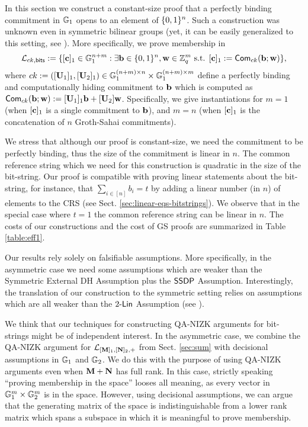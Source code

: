 In this section we construct a constant-size proof that a perfectly binding commitment in $\mathbb{G}_1$ opens to an element of $\{0,1\}^n$.   
Such a construction was unknown even in symmetric bilinear groups (yet, it can be easily generalized to this setting, see  \cite[Appendix C]{EPRINT:GonHevRaf15}).
More specifically, we prove membership in 
$$\mathcal{\mathcal{L}}_{ck,\mathsf{bits}} := 
    \{[\mathbf{c}]_1 \in \mathbb{G}_1^{n+m}: \exists \mathbf{b}\in\{0,1\}^n,\mathbf{w}\in\mathbb{Z}_q^m \text{ s.t. }
        [\mathbf{c}]_1:=  \mathsf{Com}_{ck}(\mathbf{b};\mathbf{w})
    \},$$
 where $ck:=([\mathbf{{U}}_1]_1,[\mathbf{{U}}_2]_1)\in\mathbb{G}_1^{(n+m)\times n}\times\mathbb{G}_1^{(n+m)\times m}$ define a perfectly binding and computationally hiding commitment to $\mathbf{b}$ which is computed as $\mathsf{Com}_{ck}(\mathbf{b};\allowbreak\mathbf{w}):=[\mathbf{{U}}_1]_1\mathbf{b}+[\mathbf{{U}}_2]\mathbf{w}$. Specifically, we give instantiations for $m=1$ (when $[\mathbf{c}]_1$ is a single commitment to $\mathbf{b}$), and $m=n$ (when $[\mathbf{c}]_1$ is the concatenation  of $n$ Groth-Sahai commitments).

We stress that although our proof is constant-size, we need the commitment to be perfectly binding, thus the size of the commitment is linear in $n$.  The common reference string  which we need for this construction is quadratic in the size of the bit-string. Our proof is compatible with proving linear statements about the bit-string, for instance,  
that $\sum_{i \in [n]} b_i=t$ by adding a linear number (in $n$) of elements to the CRS (see Sect. \ref{sec:linear-eqs-bitstrings}). We observe that in the special case where $t=1$ the common reference string can be linear in $n$. The costs of our constructions and the cost of GS proofs are summarized in Table \ref{table:eff1}.

Our results rely solely on falsifiable assumptions. More specifically, in the asymmetric case we need some assumptions which are weaker 
than the Symmetric External DH Assumption %
plus the $\mathsf{SSDP}$ Assumption. Interestingly, the translation of our construction to the symmetric setting relies on assumptions which are all weaker than the $2\mbox{-}\mathsf{Lin}$ Assumption (see \cite[Appendix C]{EPRINT:GonHevRaf15}).

We think that our techniques for constructing QA-NIZK arguments for bit-strings might be of independent interest. 
In the asymmetric case, we combine the QA-NIZK argument for $\mathcal{L}_{[\mathbf{{M}}]_1,[\mathbf{{N}}]_2,+}$ from Sect. \ref{sec:sum} with decisional assumptions in $\mathbb{G}_1$ and $\mathbb{G}_2$. We do this with the purpose of using QA-NIZK arguments even when $\mathbf{{M}}+\mathbf{{N}}$ has full rank. In this case, strictly speaking ``proving membership in the space'' looses all meaning, as every vector in $\mathbb{G}_1^m\times \mathbb{G}_2^m$ is in the space. However, using decisional assumptions, we can argue that the generating matrix of the space is indistinguishable from a lower rank matrix which spans a subspace in which it is meaningful to prove membership.  

